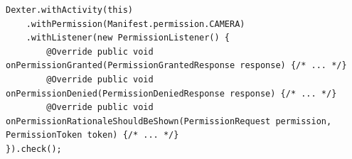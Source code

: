 \documentclass[a4paper]{article}
\begin{document}
\begin{enumerate}
    \begin{lstlisting}
Dexter.withActivity(this)
    .withPermission(Manifest.permission.CAMERA)
    .withListener(new PermissionListener() {
        @Override public void onPermissionGranted(PermissionGrantedResponse response) {/* ... */}
        @Override public void onPermissionDenied(PermissionDeniedResponse response) {/* ... */}
        @Override public void onPermissionRationaleShouldBeShown(PermissionRequest permission, PermissionToken token) {/* ... */}
}).check();
    \end{lstlisting}
    
    
\end{enumerate}
\end{document}
